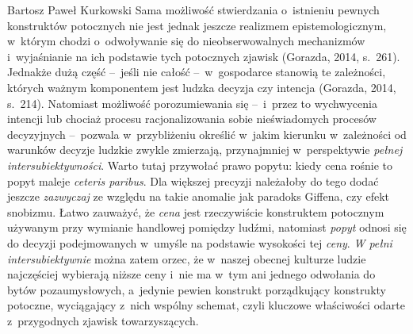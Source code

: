 \begin{artplenv}{Bartosz Paweł Kurkowski}
Sama możliwość stwierdzania o~istnieniu pewnych konstruktów potocznych nie jest jednak jeszcze realizmem
epistemologicznym, w~którym chodzi o~odwoływanie się do nieobserwowalnych mechanizmów i~wyjaśnianie na ich podstawie
tych potocznych zjawisk \label{ref:RNDRlmRjinKLB}(Gorazda, 2014, s.~261). Jednakże dużą
część --~jeśli nie całość --~w~gospodarce stanowią te zależności, których ważnym komponentem jest ludzka decyzja czy intencja
\label{ref:RNDcoiHd3hnK5}(Gorazda, 2014, s.~214). Natomiast możliwość porozumiewania się --~i~przez to wychwycenia
intencji lub chociaż procesu racjonalizowania sobie nieświadomych procesów decyzyjnych --~pozwala w~przybliżeniu
określić w~jakim kierunku w~zależności od warunków decyzje ludzkie zwykle zmierzają, przynajmniej w~perspektywie
\textit{pełnej intersubiektywności}. Warto tutaj przywołać prawo popytu: kiedy cena rośnie to popyt maleje
\textit{ceteris paribus}. Dla większej precyzji należałoby do tego dodać jeszcze \textit{zazwyczaj} ze względu na takie
anomalie jak paradoks Giffena, czy efekt snobizmu. Łatwo zauważyć, że \textit{cena} jest rzeczywiście konstruktem
potocznym używanym przy wymianie handlowej pomiędzy ludźmi, natomiast \textit{popyt }odnosi się do decyzji
podejmowanych w~umyśle na podstawie wysokości tej \textit{ceny}. \textit{W pełni intersubiektywnie }można zatem orzec,
że w~naszej obecnej kulturze ludzie najczęściej wybierają niższe ceny i~nie ma w~tym ani jednego odwołania do bytów
pozaumysłowych, a~jedynie pewien konstrukt porządkujący konstrukty potoczne, wyciągający z~nich wspólny schemat, czyli
kluczowe właściwości odarte z~przygodnych zjawisk towarzyszących.



\end{artplenv}
